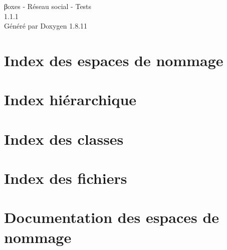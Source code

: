 \documentclass[twoside]{book}
\newcommand{\+}{\discretionary{\mbox{\scriptsize$\hookleftarrow$}}{}{}}
\newcommand{\clearemptydoublepage}{%
  \newpage{\pagestyle{empty}\cleardoublepage}%
}
\begin{document}
\hypersetup{pageanchor=false,
             bookmarksnumbered=true,
             pdfencoding=unicode
            }
\begin{titlepage}
\vspace*{7cm}
\begin{center}%
{\Large βoxes -\/ Réseau social -\/ Tests \\[1ex]\large 1.\+1.\+1 }\\
\vspace*{1cm}
{\large Généré par Doxygen 1.8.11}\\
\end{center}
\end{titlepage}
\clearemptydoublepage
\tableofcontents
\clearemptydoublepage
{}
\hypersetup{pageanchor=true}

\chapter{Index des espaces de nommage}

\chapter{Index hiérarchique}

\chapter{Index des classes}

\chapter{Index des fichiers}

\chapter{Documentation des espaces de nommage}




\end{document}
